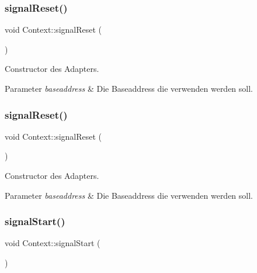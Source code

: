 \subsubsection{\texorpdfstring{signal\+Reset()}{signalReset()}\hspace{0.1cm}{\footnotesize\ttfamily [1/2]}}
{\footnotesize\ttfamily void Context\+::signal\+Reset (\begin{DoxyParamCaption}{ }\end{DoxyParamCaption})}

Constructor des Adapters.


\begin{DoxyParams}{Parameter}
{\em baseaddress} & Die Baseaddress die verwenden werden soll. \\
\hline
\end{DoxyParams}
\hypertarget{class_context_a59ea683658907374dbe23125c11b1e93}{}\label{class_context_a59ea683658907374dbe23125c11b1e93} 
\subsubsection{\texorpdfstring{signal\+Reset()}{signalReset()}\hspace{0.1cm}{\footnotesize\ttfamily [2/2]}}
{\footnotesize\ttfamily void Context\+::signal\+Reset (\begin{DoxyParamCaption}{ }\end{DoxyParamCaption})}

Constructor des Adapters.


\begin{DoxyParams}{Parameter}
{\em baseaddress} & Die Baseaddress die verwenden werden soll. \\
\hline
\end{DoxyParams}
\hypertarget{class_context_a9fbe4299614bae2f11e92ed56cde640c}{}\label{class_context_a9fbe4299614bae2f11e92ed56cde640c} 
\subsubsection{\texorpdfstring{signal\+Start()}{signalStart()}\hspace{0.1cm}{\footnotesize\ttfamily [1/2]}}
{\footnotesize\ttfamily void Context\+::signal\+Start (\begin{DoxyParamCaption}{ }\end{DoxyParamCaption})}

